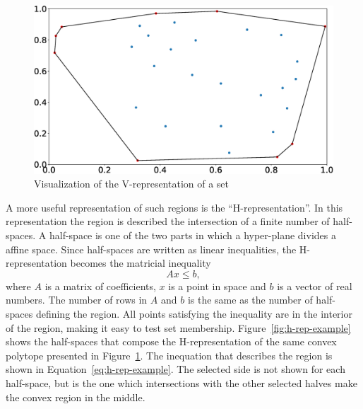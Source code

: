 \begin{figure}[!htb]
	\centering
	\includegraphics[width=\linewidth]{imgs/v-rep}
	\caption{Visualization of the V-representation of a set}%
	\label{fig:v-rep-example}
\end{figure}

A more useful representation of such regions is the \enquote{H-representation}.
In this representation the region is described the intersection of a finite
number of half-spaces. A half-space is one of the two parts in which a
hyper-plane divides a affine space. Since half-spaces are written as linear
inequalities, the H-representation becomes the matricial inequality
%
\begin{equation}
	Ax\leq{}b,
\end{equation}
%
where \(A\) is a matrix of coefficients, \(x\) is a point in space and \(b\) is
a vector of real numbers. The number of rows in \(A\) and \(b\) is the same as
the number of half-spaces defining the region. All points satisfying the
inequality are in the interior of the region, making it easy to test set
membership. Figure~\ref{fig:h-rep-example} shows the half-spaces that compose
the H-representation of the same convex polytope presented in
Figure~\ref{fig:v-rep-example}. The inequation that describes the region is
shown in Equation~\ref{eq:h-rep-example}. The selected side is not shown for
each half-space, but is the one which intersections with the other selected
halves make the convex region in the middle.

